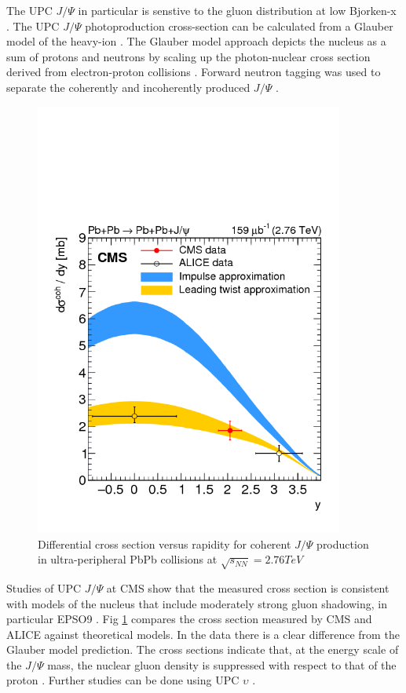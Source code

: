 The UPC $J/\Psi$ in particular is senstive to the gluon distribution at low Bjorken-x \cite{Teubner:2005sj}. The UPC $J/\Psi$ photoproduction cross-section can be calculated from a Glauber model of the heavy-ion \cite{Brodsky:1994kf}. The Glauber model approach depicts the nucleus as a sum of protons and neutrons by scaling up the photon-nuclear cross section derived from electron-proton collisions \cite{Miller:2007ri}. Forward neutron tagging was used to separate the coherently and incoherently produced $J/\Psi$ \cite{Guzey:2013jaa} \cite{Strikman:2005ze} \cite{lta2012.03}\cite{emPcite4}\cite{emPCite5}\cite{emPCite6}\cite{upcNeuPHENIX}.
\begin{figure}[h!]
\begin{centering}
\includegraphics[width=4in]{Chapter2/importfigs/patkenny_Figure_002.png}
\par\end{centering}
\caption{Differential cross section versus rapidity for coherent $J/\Psi$ production in ultra-peripheral PbPb collisions at $\sqrt{s_{NN}}=2.76 TeV$ \cite{Khachatryan:2016qhq} \label{fig:pk3}}
\end{figure}
 
Studies of UPC $J/\Psi$ at CMS show that the measured cross section is consistent with models of the nucleus that include moderately strong gluon shadowing, in particular EPSO9 \cite{lta2013.05}\cite{Eskola:2009uj}. Fig \ref{fig:pk3} compares the cross section measured by CMS and ALICE against theoretical models. In the data there is a clear difference from the Glauber model prediction. The cross sections indicate that, at the energy scale of the $J/\Psi$ mass, the nuclear gluon density is suppressed with respect to that of the proton \cite{Frankfurt:2011cs}. Further studies can be done using UPC $\upsilon$ \cite{pQCD2013.02}\cite{Cisek:2012yt}. 

